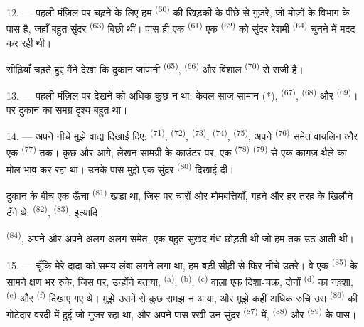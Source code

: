 12. --- पहली मंज़िल पर चढ़ने के लिए हम  \textsuperscript{(60)}
की खिड़की के पीछे से गुज़रे, जो मोज़ों के विभाग के पास है, जहाँ बहुत सुंदर
 \textsuperscript{(63)} बिछी थीं। पास ही एक 
\textsuperscript{(61)} एक  \textsuperscript{(62)} को सुंदर रेशमी
 \textsuperscript{(64)} चुनने में मदद कर रही थी।

सीढ़ियाँ चढ़ते हुए मैंने देखा कि दुकान जापानी 
\textsuperscript{(65)},  \textsuperscript{(66)} और विशाल
 \textsuperscript{(70)} से सजी है।

13. --- पहली मंज़िल पर देखने को अधिक कुछ न था: केवल साज-सामान (*),
 \textsuperscript{(67)}, 
\textsuperscript{(68)} और  \textsuperscript{(69)}। पर दुकान
का समग्र दृश्य बहुत  था।

14. --- अपने नीचे मुझे वाद्य दिखाई दिए:  \textsuperscript{(71)},
 \textsuperscript{(72)},  \textsuperscript{(73)},
 \textsuperscript{(74)},  \textsuperscript{(75)},
अपने  \textsuperscript{(76)} समेत वायलिन और एक 
\textsuperscript{(77)} तक। कुछ और आगे, लेखन-सामग्री के काउंटर पर, एक
 \textsuperscript{(78)} 
\textsuperscript{(79)} से एक काग़ज़-थैले का मोल-भाव कर रहा था। उनके पास मुझे एक
सुंदर  \textsuperscript{(80)} दिखाई दी।

दुकान के बीच एक ऊँचा  \textsuperscript{(81)} खड़ा था,
जिस पर चारों ओर मोमबत्तियाँ, गहने और हर तरह के खिलौने टँगे थे:
 \textsuperscript{(82)}, 
\textsuperscript{(83)}, इत्यादि।

 \textsuperscript{(84)}, अपने  और
अपने अलग-अलग  समेत, एक बहुत सुखद गंध छोड़ती थी जो हम तक उठ आती
थी।

\VUsaut{3.4mm}
\VUsaut{2.8mm}

15. --- चूँकि मेरे दादा को समय लंबा लगने लगा था, हम बड़ी सीढ़ी से फिर नीचे उतरे।
वे एक  \textsuperscript{(85)} के सामने क्षण भर रुके, जिस पर,
उन्होंने बताया,  \textsuperscript{(a)},
 \textsuperscript{(b)}, 
\textsuperscript{(c)}  वाला एक
दिशा-चक्र, दोनों  \textsuperscript{(d)} का नक़्शा,
 \textsuperscript{(e)} और  \textsuperscript{(f)}
दिखाए गए थे। मुझे उसमें से कुछ समझ न आया, और मुझे कहीं अधिक रुचि उस
 \textsuperscript{(86)} की गोटेदार वरदी में हुई जो
गुज़र रहा था, और अपने पास रखी उन सुंदर  \textsuperscript{(87)} में,
 \textsuperscript{(88)} और  \textsuperscript{(89)}
के पास।

